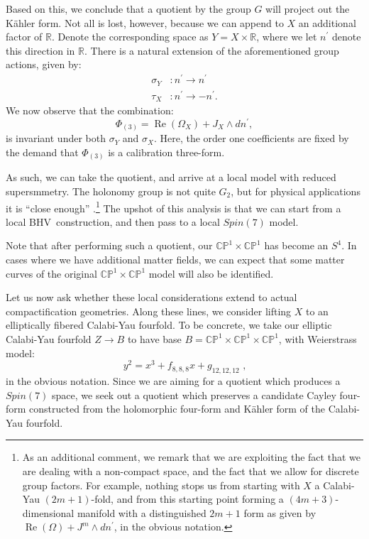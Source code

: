 \documentclass[12pt]{article}%
\providecommand{\U}[1]{\protect\rule{.1in}{.1in}}
\numberwithin{equation}{section}
\renewcommand{\(}{\left(}
\renewcommand{\)}{\right)}
\renewcommand{\[}{\left[}
\renewcommand{\]}{\right]}
\begin{document}
Based on this, we conclude that a quotient by the group $G$ will project out
the K\"ahler form. Not all is lost, however, because we can append to $X$ an
additional factor of $%
\mathbb{R}
$. Denote the corresponding space as $Y=X\times%
\mathbb{R}
$, where we let $n^{\prime}$ denote this direction in $%
\mathbb{R}
$. There is a natural extension of the aforementioned group actions, given by:%
\begin{align}
\sigma_{Y} &  :n^{\prime}\rightarrow n^{\prime}\\
\tau_{X} &  :n^{\prime}\rightarrow-n^{\prime}.
\end{align}
We now observe that the combination:%
\begin{equation}
\Phi_{(3)}=\operatorname{Re}(\Omega_{X})+J_{X}\wedge dn^{\prime},
\end{equation}
is invariant under both $\sigma_{Y}$ and $\sigma_{X}$. Here, the order one
coefficients are fixed by the demand that $\Phi_{(3)}$ is a calibration three-form.

As such, we can take the quotient, and arrive at a local model with reduced
supersmmetry. The holonomy group is not quite $G_{2}$, but for physical
applications it is \textquotedblleft close enough\textquotedblright%
.\footnote{As an additional comment, we remark that we are exploiting the fact
that we are dealing with a non-compact space, and the fact that we allow for
discrete group factors. For example, nothing stops us from starting with $X$ a
Calabi-Yau $(2m+1)$-fold, and from this starting point forming a
$(4m+3)$-dimensional manifold with a distinguished $2m+1$ form as given by
$\operatorname{Re}(\Omega)+J^{m}\wedge dn^{\prime}$, in the obvious notation.}
The upshot of this analysis is that we can start from a local
BHV\ construction, and then pass to a local $Spin(7)$ model.

Note that after performing such a quotient, our $\mathbb{CP}^1 \times \mathbb{CP}^1$ has become an
$S^4$. In cases where we have additional matter fields, we can expect that some matter curves of the original
$\mathbb{CP}^1 \times \mathbb{CP}^1$ model will also be identified.

Let us now ask whether these local considerations extend to actual
compactification geometries. Along these lines, we consider lifting $X$ to an
elliptically fibered Calabi-Yau fourfold. To be concrete, we take our elliptic
Calabi-Yau fourfold $Z\rightarrow B$ to have base $B=\mathbb{CP}^{1}%
\times\mathbb{CP}^{1}\times\mathbb{CP}^{1}$, with Weierstrass model:%
\begin{equation}
y^{2}=x^{3}+f_{8,8,8}x+g_{12,12,12}\text{ \ \ ,}%
\end{equation}
in the obvious notation. Since we are aiming for a quotient which produces a
$Spin(7)$ space, we seek out a quotient which preserves a candidate Cayley
four-form constructed from the holomorphic four-form and K\"ahler form of
the Calabi-Yau fourfold.
\end{document}
